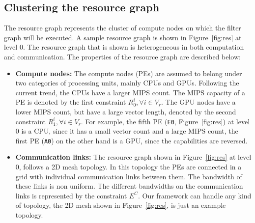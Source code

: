 \subsection{Clustering the resource graph}
\label{sec:gener-reso-graph}

The resource graph represents the cluster of compute nodes on which the
filter graph will be executed. %
A sample resource graph is shown in Figure~\ref{fig:res} at level 0. The
resource graph that is shown is heterogeneous in both computation and
communication. The properties of the resource graph are described below:

\begin{itemize}

\item \textbf{Compute nodes:} The compute nodes (PEs) are assumed to
  belong under two categories of processing units, mainly CPUs and
  GPUs. Following the current trend, the CPUs have a larger MIPS
  count. The MIPS capacity of a PE is denoted by the first constraint
  $R^i_0, \forall i \in V_r$. The GPU nodes have a lower MIPS count, but
  have a large vector length, denoted by the second constraint
  $R^i_1, \forall i \in V_r$. For example, the fifth PE (\texttt{E0},
Figure~\ref{fig:res}) at
  level 0 is a CPU, since it has a small vector count and a large MIPS
  count, the first PE (\texttt{A0}) on the other hand is a GPU, since
  the capabilities are reversed.


\item \textbf{Communication links:} The resource graph shown in
  Figure~\ref{fig:res} at level 0, follows a 2D mesh topology. In this
  topology the PEs are connected in a grid with individual communication
  links between them. The bandwidth of these links is non uniform. The
  different bandwidths on the communication links is represented by the
  constraint $E^C$. Our framework can handle any kind of topology, the
  2D mesh shown in Figure~\ref{fig:res}, is just an example topology.

\end{itemize}

